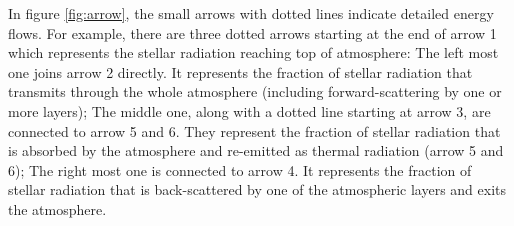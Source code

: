 \documentclass[a4paper,12pt]{article}
\begin{document}
In figure \ref{fig:arrow}, the small arrows with dotted lines indicate detailed energy flows. For example, there are three dotted arrows starting at the end of arrow 1 which represents the stellar radiation reaching top of atmosphere: The left most one joins arrow 2 directly. It represents the fraction of stellar radiation that transmits through the whole atmosphere (including forward-scattering by one or more layers); The middle one, along with a dotted line starting at arrow 3, are connected to arrow 5 and 6. They represent the fraction of stellar radiation that is absorbed by the atmosphere and re-emitted as thermal radiation (arrow 5 and 6); The right most one is connected to arrow 4. It represents the fraction of stellar radiation that is back-scattered by one of the atmospheric layers and exits the atmosphere.
\end{document}
